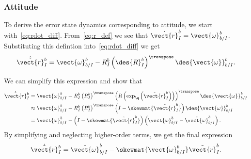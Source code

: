 

\subsubsection{Attitude}

To derive the error state dynamics corresponding to attitude, we start
with~\eqref{eq:rdot_diff}. From~\eqref{eq:r_def} we see that $\dot{\vect{r}}_I^b
= \vect{\omega}_{b/I}^b$. Substituting this defintion into~\eqref{eq:rdot_diff}
we get
\begin{equation}
\dot{\tilde{\vect{r}}}_I^b = \vect{\omega}_{b/I}^{b} -
R_I^b\left(\des{R}_I^b\right)^\transpose \des{\vect{\omega}}_{b/I}^{b}.
\end{equation}

We can simplify this expression and show that
\begin{align}
  \dot{\tilde{\vect{r}}}_I^b &= \vect{\omega}_{b/I}^{b} -
  R_I^b 
  \left(R_{I}^{b}\right)^\transpose
  \left(R\left(\exp_{\q}\left(\tilde{\vect{r}}_{I}^{b}\right)\right)\right)^\transpose
  \des{\vect{\omega}}_{b/I}^{b} \\
  &\approx \vect{\omega}_{b/I}^{b} -
  R_I^b \left(R_{I}^{b}\right)^\transpose \left( I - \skewmat{\tilde{\vect{r}}_I^b}
  \right) \des{\vect{\omega}}_{b/I}^{b} \\
  &= \vect{\omega}_{b/I}^{b} -
  \left( I - \skewmat{\tilde{\vect{r}}_I^b}
  \right) \left(\vect{\omega}_{b/I}^{b} - \tilde{\vect{\omega}}_{b/I}^{b}\right).
\end{align}
By simplifying and neglecting higher-order terms, we get the final expression
\begin{equation}
  \dot{\tilde{\vect{r}}}_I^b = \tilde{\vect{\omega}}_{b/I}^{b} -
  \skewmat{\vect{\omega}_{b/I}^{b} } \tilde{\vect{r}}_I^b.
\end{equation}


